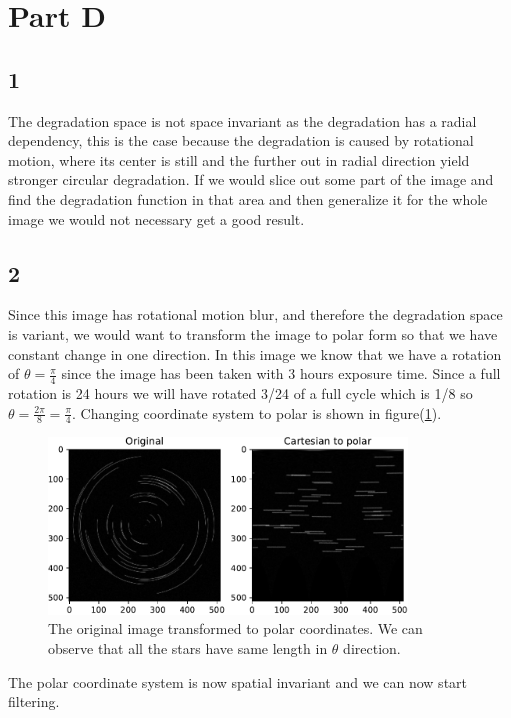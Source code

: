 {\section{Part D}
\subsection{1}

The degradation space is not space invariant as the degradation has a radial dependency, this is the case because the degradation is caused by rotational motion, where its center is still and the further out in radial direction yield stronger circular degradation. If we would slice out some part of the image and find the degradation function in that area and then generalize it for the whole image we would not necessary get a good result.


\subsection{2}

Since this image has rotational motion blur, and therefore the degradation space is variant, we would want to transform the image to polar form so that we have constant change in one direction. In this image we know that we have a rotation of $\theta = \frac{\pi}{4}$ since the image has been taken with 3 hours exposure time. Since a full rotation is 24 hours we will have rotated 3/24 of a full cycle which is 1/8 so $\theta = \frac{2\pi}{8} = \frac{\pi}{4}$. Changing coordinate system to polar is shown in figure(\ref{changingsystem}).


\begin{figure}[!htb]
    {\centering
        \includegraphics[width=0.85\textwidth]{carttopol.pdf}
        \caption{The original image transformed to polar coordinates. We can observe that all the stars have same length in $\theta$ direction.}
        \label{changingsystem}
    \par}
    \end{figure}
The polar coordinate system is now spatial invariant and we can now start filtering.

}
